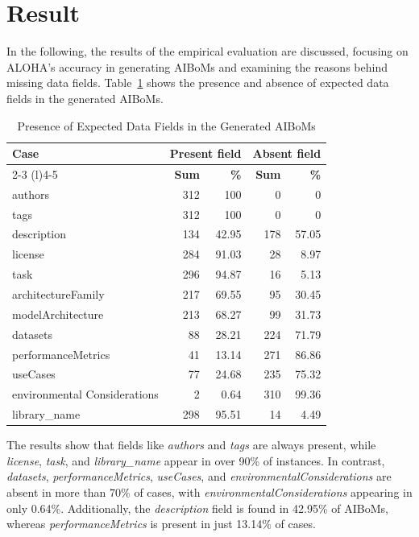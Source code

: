\documentclass[12pt,a4paper, oneside, openright]{book}
\newcommand{\aiboms}{{AIBoMs}\xspace}
\begin{document}
\section{Result}
In the following, the results of the empirical evaluation are discussed, focusing on ALOHA’s accuracy in generating \aiboms and examining the reasons behind missing data fields.
Table~\ref{tab:fieldsPresent} shows the presence and absence of expected data fields in the generated \aiboms. 

\begin{table}[!h]
\centering
\caption{Presence of Expected Data Fields in the Generated \aiboms}
\label{tab:fieldsPresent}
\begin{tabular}{lrrrr}
\toprule
\multirow{2.5}{*}{\textbf{Case}}        & \multicolumn{2}{l}{\textbf{Present field}} & \multicolumn{2}{l}{\textbf{Absent field}} \\
\cmidrule{2-3} \cmidrule(l){4-5}
       & \textbf{Sum} & \textbf{\%}    & \textbf{Sum} & \textbf{\%}   \\
\midrule
authors  & 312 & 100 & 0  & 0 \\
tags  & 312 & 100 &  0 & 0 \\
description  & 134 & 42.95 & 178 & 57.05 \\
license   & 284 & 91.03 & 28 & 8.97 \\
task  & 296 & 94.87 & 16 & 5.13 \\
architectureFamily  & 217 & 69.55 & 95 & 30.45 \\
modelArchitecture & 213 & 68.27 & 99 & 31.73 \\
datasets   & 88 & 28.21 & 224 & 71.79 \\
performanceMetrics & 41 & 13.14 & 271 & 86.86 \\
useCases         & 77 & 24.68 & 235 & 75.32 \\
environmental Considerations & 2  & 0.64 & 310 & 99.36 \\
library\_name    & 298 & 95.51 & 14  & 4.49        \\  
\bottomrule
\end{tabular}
\end{table}


The results show that fields like \textit{authors} and \textit{tags} are always present, while \textit{license}, \textit{task}, and \textit{library\_name} appear in over 90\% of instances. In contrast, \textit{datasets}, \textit{performanceMetrics}, \textit{useCases}, and \textit{environmentalConsiderations} are absent in more than 70\% of cases, with \textit{environmentalConsiderations} appearing in only 0.64\%. Additionally, the \textit{description} field is found in 42.95\% of \aiboms, whereas \textit{performanceMetrics} is present in just 13.14\% of cases.
\end{document}
